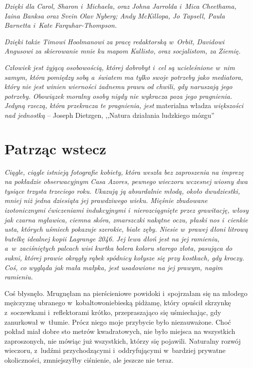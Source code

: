 \documentclass[oneside,polish,11pt,sfheadings]{mwbk}
\let\footnote=\endnote
\begin{document}
\textit{Dzięki dla Carol, Sharon i~Michaela, oraz Johna Jarrolda i~Mica
Cheethama, Iaina Banksa oraz Svein Olav Nyberg; Andy McKillopa, Jo
Tapsell, Paula Barnetta i~Kate Farquhar-Thompson.}

\textit{Dzięki także Timowi Hoolmanowi za pracę redaktorską w~Orbit,
Davidowi Angusowi za skierowanie mnie ku mapom Kallisto, oraz
socjalistom, za Ziemię.}

\newpage


\textit{Człowiek jest żyjącą osobowością, której dobrobyt i~cel są
ucieleśnione w~nim samym, która pomiędzy sobą a~światem ma tylko swoje
potrzeby jako mediatora, który nie jest winien wierności żadnemu prawu
od chwili, gdy naruszają jego potrzeby. Obowiązek moralny osoby nigdy
nie wykracza poza jego pragnienia. Jedyną rzeczą, która przekracza te
pragnienia, jest }materialna władza \textit{większości nad jednostką} -- Joseph Dietzgen, ,,Natura działania ludzkiego mózgu''\footnote{tłum.
własne}


\chapter{Patrząc wstecz}

\textit{Ciągle, ciągle istnieją fotografie kobiety, która weszła bez
zaproszenia na imprezę na pokładzie obserwacyjnym Casa Azores, pewnego
wieczoru wczesnej wiosny dwa tysiące trzysta trzeciego roku. Ukazują ją
absurdalnie młodą, około dwudziestki, mniej niż jedna dziesiąta jej
prawdziwego wieku. Mięśnie zbudowane izotonicznymi ćwiczeniami
indukcyjnymi i~nierozciągnięte przez grawitację, włosy jak czarna
mgławica, ciemna skóra, zmarszczki nakątne oczu, płaski nos i~cienkie
usta, których uśmiech pokazuje szerokie, białe zęby. Niesie w~prawej
dłoni litrową butelkę idealnej kopii Lagrange 2046. Jej lewa dłoń jest
na jej ramieniu, a~w~zaciśniętych palcach wisi kurtka bolera koloru
starego złota, pasująca do sukni, której prawie okrągły rąbek spódnicy
kołysze się przy kostkach, gdy kroczy. Coś, co wygląda jak mała małpka,
jest usadowione na jej prawym, nagim ramieniu.}

Coś błysnęło. Mrugnęłam na pierścieniowe powidoki i~spojrzałam się na
młodego mężczyznę ubranego w~kobaltowoniebieską pidżamę, który opuścił
skrzynkę z~soczewkami i~reflektorami krótko, przepraszająco się
uśmiechając, gdy zanurkował w~tłumie. Prócz niego moje przybycie było
niezauważone. Choć pokład miał dobre sto metrów kwadratowych, nie było
miejsca na wszystkich zaproszonych, nie mówiąc już wszystkich, którzy
się pojawili. Naturalny rozwój wieczoru, z~ludźmi przychodzącymi i~oddryfującymi w~bardziej prywatne okoliczności, zmniejszyłby ciśnienie,
ale jeszcze nie teraz.
\end{document}
